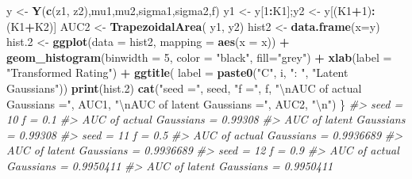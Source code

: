 \documentclass[
]{book}
\newenvironment{Shaded}{\begin{snugshade}}{\end{snugshade}}
\newcommand{\CharTok}[1]{\textcolor[rgb]{0.31,0.60,0.02}{#1}}
\newcommand{\CommentTok}[1]{\textcolor[rgb]{0.56,0.35,0.01}{\textit{#1}}}
\newcommand{\DataTypeTok}[1]{\textcolor[rgb]{0.13,0.29,0.53}{#1}}
\newcommand{\DecValTok}[1]{\textcolor[rgb]{0.00,0.00,0.81}{#1}}
\newcommand{\FloatTok}[1]{\textcolor[rgb]{0.00,0.00,0.81}{#1}}
\newcommand{\KeywordTok}[1]{\textcolor[rgb]{0.13,0.29,0.53}{\textbf{#1}}}
\newcommand{\NormalTok}[1]{#1}
\newcommand{\OperatorTok}[1]{\textcolor[rgb]{0.81,0.36,0.00}{\textbf{#1}}}
\newcommand{\StringTok}[1]{\textcolor[rgb]{0.31,0.60,0.02}{#1}}
\begin{document}
\begin{Shaded}
\begin{Highlighting}[]
\NormalTok{  y \textless{}{-}}\StringTok{ }\KeywordTok{Y}\NormalTok{(}\KeywordTok{c}\NormalTok{(z1, z2),mu1,mu2,sigma1,sigma2,f)}
\NormalTok{  y1 \textless{}{-}}\StringTok{ }\NormalTok{y[}\DecValTok{1}\OperatorTok{:}\NormalTok{K1];y2 \textless{}{-}}\StringTok{ }\NormalTok{y[(K1}\OperatorTok{+}\DecValTok{1}\NormalTok{)}\OperatorTok{:}\NormalTok{(K1}\OperatorTok{+}\NormalTok{K2)]}
\NormalTok{  AUC2 \textless{}{-}}\StringTok{ }\KeywordTok{TrapezoidalArea}\NormalTok{( y1, y2)}
\NormalTok{  hist2 \textless{}{-}}\StringTok{ }\KeywordTok{data.frame}\NormalTok{(}\DataTypeTok{x=}\NormalTok{y)}
\NormalTok{  hist}\FloatTok{.2}\NormalTok{ \textless{}{-}}\StringTok{  }\KeywordTok{ggplot}\NormalTok{(}\DataTypeTok{data =}\NormalTok{ hist2, }\DataTypeTok{mapping =} \KeywordTok{aes}\NormalTok{(}\DataTypeTok{x =}\NormalTok{ x)) }\OperatorTok{+}
\StringTok{    }\KeywordTok{geom\_histogram}\NormalTok{(}\DataTypeTok{binwidth =} \DecValTok{5}\NormalTok{, }\DataTypeTok{color =} \StringTok{"black"}\NormalTok{, }\DataTypeTok{fill=}\StringTok{"grey"}\NormalTok{) }\OperatorTok{+}
\StringTok{    }\KeywordTok{xlab}\NormalTok{(}\DataTypeTok{label =} \StringTok{"Transformed Rating"}\NormalTok{) }\OperatorTok{+}\StringTok{ }
\StringTok{    }\KeywordTok{ggtitle}\NormalTok{(}
      \DataTypeTok{label =} \KeywordTok{paste0}\NormalTok{(}\StringTok{"C"}\NormalTok{, i, }\StringTok{": "}\NormalTok{, }\StringTok{"Latent Gaussians"}\NormalTok{))}
  \KeywordTok{print}\NormalTok{(hist}\FloatTok{.2}\NormalTok{)}
  \KeywordTok{cat}\NormalTok{(}\StringTok{"seed ="}\NormalTok{, seed, }\StringTok{"f ="}\NormalTok{, f, }
      \StringTok{"}\CharTok{\textbackslash{}n}\StringTok{AUC of actual Gaussians ="}\NormalTok{, AUC1, }
      \StringTok{"}\CharTok{\textbackslash{}n}\StringTok{AUC of latent Gaussians ="}\NormalTok{, AUC2, }\StringTok{"}\CharTok{\textbackslash{}n}\StringTok{"}\NormalTok{)}
\NormalTok{\}}
\CommentTok{\#\textgreater{} seed = 10 f = 0.1 }
\CommentTok{\#\textgreater{} AUC of actual Gaussians = 0.99308 }
\CommentTok{\#\textgreater{} AUC of latent Gaussians = 0.99308}
\CommentTok{\#\textgreater{} seed = 11 f = 0.5 }
\CommentTok{\#\textgreater{} AUC of actual Gaussians = 0.9936689 }
\CommentTok{\#\textgreater{} AUC of latent Gaussians = 0.9936689}
\CommentTok{\#\textgreater{} seed = 12 f = 0.9 }
\CommentTok{\#\textgreater{} AUC of actual Gaussians = 0.9950411 }
\CommentTok{\#\textgreater{} AUC of latent Gaussians = 0.9950411}
\end{Highlighting}
\end{Shaded}
\end{document}
